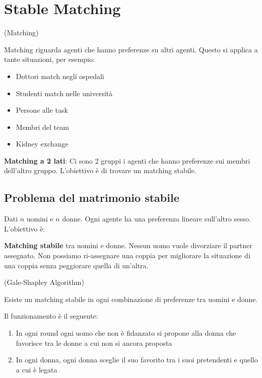 \section{Stable Matching}
\begin{definition}
    (Matching)

    Matching riguarda agenti che hanno preferenze su altri agenti. Questo si 
    applica a tante situazioni, per esempio:
    \begin{itemize}
        \item Dottori match negli ospedali
        \item Studenti match nelle università
        \item Persone alle task
        \item Membri del team 
        \item Kidney exchange
    \end{itemize}
\end{definition}

\textbf{Matching a 2 lati}: Ci sono 2 gruppi i agenti che hanno preferenze 
sui membri dell'altro gruppo. L'obiettivo è di trovare un matching stabile.

\subsection{Problema del matrimonio stabile}

Dati $n$ uomini e $n$ donne. Ogni agente ha una preferenza lineare 
sull'altro sesso. L'obiettivo è:

\textbf{Matching stabile} tra uomini e donne. Nessun uomo vuole divorziare
il partner assegnato. Non possiamo ri-assegnare una coppia per 
migliorare la situazione di una coppia senza peggiorare quella di un'altra.

\begin{definition}
    (Gale-Shapley Algorithm)

    Esiste un matching stabile in ogni combinazione di preferenze tra uomini e donne.

    Il funzionamento è il seguente:
    \begin{enumerate}
        \item In ogni round ogni uomo che non è fidanzato si propone alla donna che favorisce tra le donne a cui non si ancora proposta
        \item In ogni donna, ogni donna sceglie il suo favorito tra i suoi pretendenti e quello a cui è legata
    \end{enumerate}
\end{definition}

